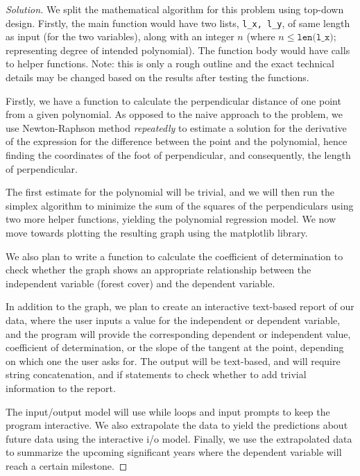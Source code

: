 \documentclass[12pt]{article}
\newenvironment{solution}
  {\renewcommand\qedsymbol{$\blacksquare$}
  \begin{proof}[Solution]}
  {\end{proof}}
\renewcommand\qedsymbol{$\blacksquare$}
\begin{document}
\begin{enumerate}
\begin{solution}
We split the mathematical algorithm for this problem using top-down design. Firstly, the main function would have two lists, \texttt{l\_x, l\_y}, of same length as input (for the two variables), along with an integer $n$ (where $n \leq \texttt{len(l\_x)}$; representing degree of intended polynomial). The function body would have calls to helper functions. Note: this is only a rough outline and the exact technical details may be changed based on the results after testing the functions.

Firstly, we have a function to calculate the perpendicular distance of one point from a given polynomial. As opposed to the naive approach to the problem, we use Newton-Raphson method \textit{repeatedly} to estimate a solution for the derivative of the expression for the difference between the point and the polynomial, hence finding the coordinates of the foot of perpendicular, and consequently, the length of perpendicular.

The first estimate for the polynomial will be trivial, and we will then run the simplex algorithm to minimize the sum of the squares of the perpendiculars using two more helper functions, yielding the polynomial regression model. We now move towards plotting the resulting graph using the matplotlib library.

We also plan to write a function to calculate the coefficient of determination to check whether the graph shows an appropriate relationship between the independent variable (forest cover) and the dependent variable. 

In addition to the graph, we plan to create an interactive text-based report of our data, where the user  inputs a value for the independent or dependent variable, and the program will provide the corresponding dependent or independent value, coefficient of determination, or the slope of the tangent at the point, depending on which one the user asks for. The output will be text-based, and will require string concatenation, and if statements to check whether to add trivial information to the report. 

The input/output model will use while loops and input prompts to keep the program interactive. We also extrapolate the data to yield the predictions about future data using the interactive i/o model. Finally, we use the extrapolated data to summarize the upcoming significant years where the dependent variable will reach a certain milestone.


\end{solution}

\maketitle

\newpage

 \end{enumerate}
\end{document}
